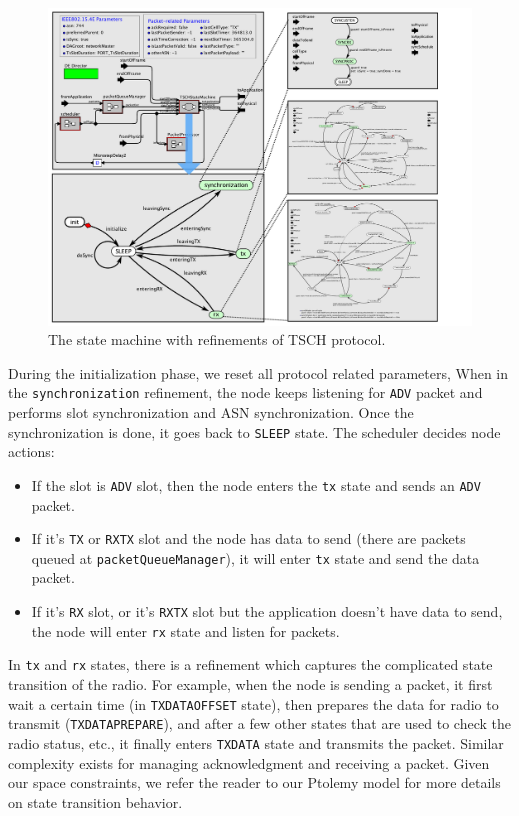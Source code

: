 \begin{figure}[t]
\centering
\includegraphics[width=1\columnwidth]{figures/PaperTSCHStateMachine}
\caption{The state machine with refinements of TSCH protocol.}
\label{fig:TSCHSM}
\end{figure}

During the initialization phase, we reset all protocol related parameters, When in the \texttt{synchronization} refinement, the node keeps listening for \texttt{ADV} packet and performs slot synchronization and ASN synchronization. Once the synchronization is done, it goes back to \texttt{SLEEP} state.
The scheduler decides node actions: 
\begin{itemize}
\item If the slot is \texttt{ADV} slot, then the node enters the \texttt{tx} state and sends an \texttt{ADV} packet. 
\item If it's \texttt{TX} or \texttt{RXTX} slot and the node has data to send (there are packets queued at \texttt{packetQueueManager}), it will enter \texttt{tx} state and send the data packet. 
\item If it's \texttt{RX} slot, or it's \texttt{RXTX} slot but the application doesn't have data to send, the node will enter \texttt{rx} state and listen for packets.
\end{itemize}

In \texttt{tx} and \texttt{rx} states, there is a refinement which captures the complicated state transition of the radio. For example, when the node is sending a packet, it first wait a certain time (in \texttt{TXDATAOFFSET} state), then prepares the data for radio to transmit (\texttt{TXDATAPREPARE}), and after a few other states that are used to check the radio status, etc., it finally enters \texttt{TXDATA} state and transmits the packet. Similar complexity exists for managing acknowledgment and receiving a packet. Given our space constraints, we refer the reader to our Ptolemy model for more details on state transition behavior.

